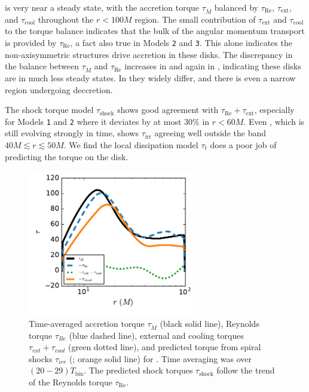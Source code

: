  is very near a steady state, with the accretion torque $\tau_{\dot{M}}$ balanced by $\tau_\text{Re}$, $\tau_\text{ext}$, and $\tau_\text{cool}$ throughout the $r < 100M$ region.  The small contribution of $\tau_\text{ext}$ and $\tau_\text{cool}$ to the torque balance indicates that the bulk of the angular momentum transport is provided by $\tau_\text{Re}$, a fact also true in Models \texttt{2} and \texttt{3}.  This alone indicates the non-axisymmetric structures drive accretion in these disks.  The discrepancy in the balance between $\tau_{\dot{M}}$ and $\tau_\text{Re}$ increases in  and again in , indicating these disks are in much less steady states.  In  they widely differ, and there is even a narrow region undergoing deccretion.  

The shock torque model $\tau_\text{shock}$ shows good agreement with $\tau_\text{Re}+\tau_\text{ext}$, especially for Models \texttt{1} and \texttt{2} where it deviates by at most $30\%$ in $r < 60M$.  Even , which is still evolving strongly in time, shows $\tau_\text{irr}$ agreeing well outside the band $40M \lesssim r \lesssim 50M$.  We find the local dissipation model $\tau_t$ does a poor job of predicting the torque on the disk.

\begin{figure}
\begin{center}
	\includegraphics[width=0.65\textwidth]{figures/minidisk/q011_m2_torque_r.pdf}
\end{center}
	\caption{ Time-averaged accretion torque $\tau_{\dot{M}}$ (black solid line), Reynolds torque $\tau_{Re}$ (blue dashed line), external and cooling torques $\tau_{ext}+\tau_{cool}$ (green dotted line), and predicted torque from spiral shocks $\tau_{irr}$ (; orange solid line) for . Time averaging was over $(20-29)T_\text{bin}$.  The predicted shock torques $\tau_\text{shock}$ follow the trend of the Reynolds torque $\tau_\text{Re}$.}  
\end{figure}


